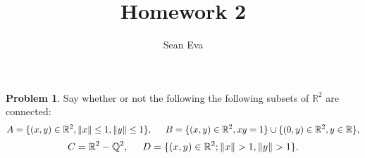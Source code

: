 \documentclass[11pt]{article}
\title{Homework 2}
\author{Sean Eva}
\theoremstyle{definition}
\newtheorem{problem}{Problem}
\newcommand{\R}{\mathbb{R}}
\newcommand{\Q}{\mathbb{Q}}
\begin{document}
\maketitle

\begin{problem}
Say whether or not the following the following subsets of $\R^2$ are connected:
\begin{equation*}
    A = \{(x, y) \in \R^2, \|x\| \leq 1, \|y\| \leq 1\},\hspace{0.5cm} B = \{(x, y)\in \R^2, xy = 1\} \cup \{(0, y)\in \R^2, y \in \R\},
\end{equation*}
\begin{equation*}
    C = \R^2 - \Q^2,\hspace{0.5cm} D = \{(x, y)\in \R^2; \|x\| > 1, \|y\| > 1\}.
\end{equation*}
\end{problem}
\end{document}
